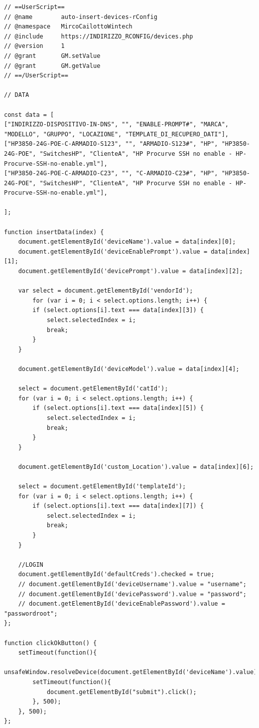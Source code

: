 \documentclass[Tesi.tex]{subfiles}
\begin{document}
\begin{lstlisting}[caption=Script GreaseMonkey di popolamento rConfig]
// ==UserScript==
// @name        auto-insert-devices-rConfig
// @namespace   MircoCailottoWintech
// @include     https://INDIRIZZO_RCONFIG/devices.php
// @version     1
// @grant       GM.setValue
// @grant       GM.getValue
// ==/UserScript==

// DATA

const data = [
["INDIRIZZO-DISPOSITIVO-IN-DNS", "", "ENABLE-PROMPT#", "MARCA", "MODELLO", "GRUPPO", "LOCAZIONE", "TEMPLATE_DI_RECUPERO_DATI"],
["HP3850-24G-POE-C-ARMADIO-S123", "", "ARMADIO-S123#", "HP", "HP3850-24G-POE", "SwitchesHP", "ClienteA", "HP Procurve SSH no enable - HP-Procurve-SSH-no-enable.yml"],
["HP3850-24G-POE-C-ARMADIO-C23", "", "C-ARMADIO-C23#", "HP", "HP3850-24G-POE", "SwitchesHP", "ClienteA", "HP Procurve SSH no enable - HP-Procurve-SSH-no-enable.yml"],

];

function insertData(index) {
	document.getElementById('deviceName').value = data[index][0];
	document.getElementById('deviceEnablePrompt').value = data[index][1];
	document.getElementById('devicePrompt').value = data[index][2];
	
	var select = document.getElementById('vendorId');
		for (var i = 0; i < select.options.length; i++) {
		if (select.options[i].text === data[index][3]) {
			select.selectedIndex = i;
			break;
		}
	}
	
	document.getElementById('deviceModel').value = data[index][4];
	
	select = document.getElementById('catId');
	for (var i = 0; i < select.options.length; i++) {
		if (select.options[i].text === data[index][5]) {
			select.selectedIndex = i;
			break;
		}
	}

	document.getElementById('custom_Location').value = data[index][6];

	select = document.getElementById('templateId');
	for (var i = 0; i < select.options.length; i++) {
		if (select.options[i].text === data[index][7]) {
			select.selectedIndex = i;
			break;
		}
	}
	
	//LOGIN
	document.getElementById('defaultCreds').checked = true;
	// document.getElementById('deviceUsername').value = "username";
	// document.getElementById('devicePassword').value = "password";
	// document.getElementById('deviceEnablePassword').value = "passwordroot";
};

function clickOkButton() {
	setTimeout(function(){
		unsafeWindow.resolveDevice(document.getElementById('deviceName').value);
		setTimeout(function(){
			document.getElementById("submit").click();
		}, 500);
	}, 500);
};


\end{lstlisting}
\end{document}

